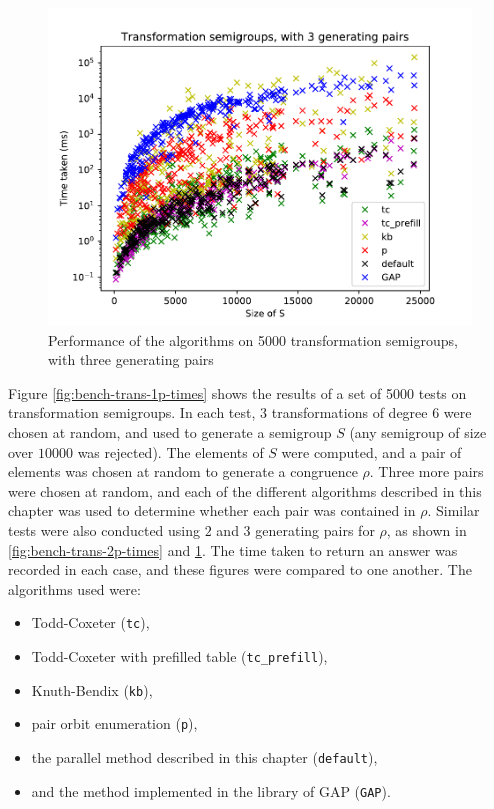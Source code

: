 \begin{figure}[h]
  \centering
  \includegraphics[width=\textwidth]{pics/ch-pairs/bench-trans-3p-times}
  \caption{Performance of the algorithms on 5000 transformation semigroups, with
    three generating pairs}
  \label{fig:bench-trans-3p-times}
\end{figure}

Figure \ref{fig:bench-trans-1p-times} shows the results of a set of 5000 tests
on transformation semigroups.  In each test, $3$ transformations of degree $6$
were chosen at random, and used to generate a semigroup $S$ (any semigroup of
size over $10000$ was rejected).  The elements of $S$ were computed, and a pair
of elements was chosen at random to generate a congruence $\rho$.  Three more
pairs were chosen at random, and each of the different algorithms described in
this chapter was used to determine whether each pair was contained in $\rho$.
Similar tests were also conducted using $2$ and $3$ generating pairs for $\rho$,
as shown in \ref{fig:bench-trans-2p-times} and \ref{fig:bench-trans-3p-times}.
The time taken to return an answer was recorded in each case, and these figures
were compared to one another.  The algorithms used were:
\begin{itemize}
\item Todd-Coxeter (\texttt{tc}),
\item Todd-Coxeter with prefilled table (\texttt{tc\_prefill}),
\item Knuth-Bendix (\texttt{kb}),
\item pair orbit enumeration (\texttt{p}),
\item the parallel method described in this chapter (\texttt{default}),
\item and the method implemented in the library of GAP (\texttt{GAP}).
\end{itemize}

